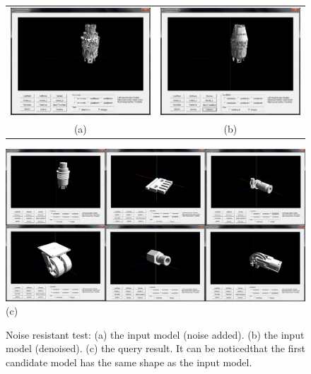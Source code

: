 \begin{figure}
\begin{center}
\begin{tabular}{cc}   %
   \includegraphics[width=0.45\linewidth]{input_noiseinvariant_test_addnoise10} & 
   \includegraphics[width=0.45\linewidth]{input_noiseinvariant_test_denoise10}  \\
   (a) & (b) \\
\end{tabular}
   \includegraphics[width=1\linewidth]{output_noiseinvariant_test10}  \\
   (c)  \\
\caption{Noise resistant test: (a) the input model (noise added). (b) the input model (denoised). (c) the query result. It can be noticedthat the first candidate model has the same shape as the input model.} 
  \label{noiseinvarianttest_UI}
\end{center}
\end{figure}

